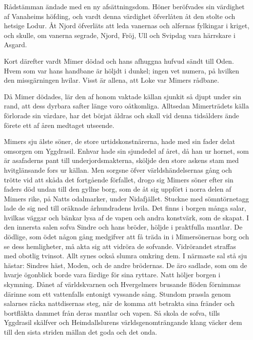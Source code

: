 Rådstämman ändade med en ny afsättningsdom. Höner beröfvades sin
värdighet af Vanaheims höfding, och vardt denna värdighet öfverlåten åt
den stolte och hetsige Lodur. Åt Njord öfverläts att leda vanernas och
alfernas fylkingar
\protect\hypertarget{lb1625905.xhtmlux5cux23start147}{}{}\protect\hypertarget{lb1625905.xhtmlux5cux23start147-a}{}{}\protect\hypertarget{lb1625905.xhtmlux5cux23start147-b}{}{}\protect\hypertarget{lb1625905.xhtmlux5cux23start147-c}{}{}\protect\hypertarget{lb1625905.xhtmlux5cux23start147-d}{}{}
i kriget, och skulle, om vanerna segrade, Njord, Fröj, Ull och Svipdag
vara härrskare i Asgard.

Kort därefter vardt Mimer dödad och hans afhuggna hufvud sändt till
Oden. Hvem som var hans handbane är höljdt i dunkel; ingen vet numera,
på hvilken den missgärningen hvilar. Visst är allena, att Loke var
Mimers rådbane.

Då Mimer dödades, lär den af honom vaktade källan sjunkit så djupt under
sin rand, att dess dyrbara safter länge voro oåtkomliga. Alltsedan
Mimerträdets källa förlorade sin vårdare, har det börjat åldras och
skall vid denna tidsålders ände förete ett af åren medtaget utseende.

Mimers sju älste söner, de store urtidskonstnärerna, hade med sin fader
delat omsorgen om Yggdrasil. Enhvar hade sin sjundedel af året, då han
ur hornet, som är asafaderns pant till underjordsmakterna, sköljde den
store askens stam med hvitglänsande fors ur källan. Men sorgsne öfver
världshändelsernas gång och trötte vid att skåda det fortgående
förfallet, drogo sig Mimers söner efter sin faders död undan till den
gyllne borg, som de åt sig uppfört i norra delen af Mimers rike, på
Natts odalmarker, under Nidafjället. Stuckne med sömntörnetagg lade de
sig ned till oräknade århundradens hvila. Det finns i borgen många
salar, hvilkas väggar och bänkar lysa af de vapen och andra konstvärk,
som de skapat. I den innersta salen sofva Sindre och hans bröder, höljde
i praktfulla mantlar. De dödlige, som ödet någon gång medgifver att få
träda in i Mimersönernas borg och se dess hemligheter, må akta sig att
vidröra de sofvande. Vidrörandet straffas med obotlig tvinsot. Allt
synes också slumra omkring dem. I närmaste sal stå sju hästar: Sindres
häst, Moden, och de andre brödernas. De äro sadlade, som om de hvarje
ögonblick borde vara färdige för sina ryttare. Natt höljer borgen i
skymning. Dånet af världskvarnen och Hvergelmers brusande flöden
förnimmas därinne som ett vattenfalls entonigt vyssande sång. Stundom
prassla genom salarnes räcka nattdisernas steg, när de komma att
betrakta sina fränder och bortfläkta dammet från deras mantlar och
vapen.
\protect\hypertarget{lb1625905.xhtmlux5cux23start148}{}{}\protect\hypertarget{lb1625905.xhtmlux5cux23start148-a}{}{}\protect\hypertarget{lb1625905.xhtmlux5cux23start148-b}{}{}\protect\hypertarget{lb1625905.xhtmlux5cux23start148-c}{}{}\protect\hypertarget{lb1625905.xhtmlux5cux23start148-d}{}{}
Så skola de sofva, tills Yggdrasil skälfver och Heimdallslurens
världsgenomträngande klang väcker dem till den sista striden mällan det
goda och det onda.

